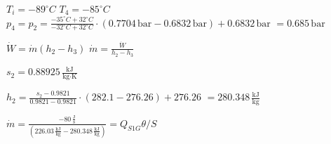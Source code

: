 \( T_i = -89^\circ C \)  
\( T_4 = -85^\circ C \)  
\( p_4 = p_2 = \frac{-35^\circ C + 32^\circ C}{-32^\circ C + 32^\circ C} \cdot (0.7704 \, \text{bar} - 0.6832 \, \text{bar}) + 0.6832 \, \text{bar} \)  
\( = 0.685 \, \text{bar} \)  

\( \dot{W} = \dot{m} (h_2 - h_3) \)  
\( \dot{m} = \frac{\dot{W}}{h_2 - h_3} \)  

\( s_2 = 0.88925 \, \frac{\text{kJ}}{\text{kg·K}} \)  

\( h_2 = \frac{s_2 - 0.9821}{0.9821 - 0.9821} \cdot (282.1 - 276.26) + 276.26 \)  
\( = 280.348 \, \frac{\text{kJ}}{\text{kg}} \)  

\( \dot{m} = \frac{-80 \, \frac{\text{J}}{\text{s}}}{(226.03 \, \frac{\text{kJ}}{\text{kg}} - 280.348 \, \frac{\text{kJ}}{\text{kg}})} = Q_{S1G} \theta / S \)